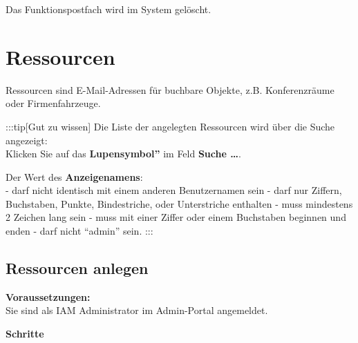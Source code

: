 \documentclass[
  letterpaper,
  DIV=11,
  numbers=noendperiod]{scrreprt}
\begin{document}
Das Funktionspostfach wird im System gelöscht.

\section{Ressourcen}\label{ressourcen}

Ressourcen sind E-Mail-Adressen für buchbare Objekte, z.B.
Konferenzräume oder Firmenfahrzeuge.

:::tip{[}Gut zu wissen{]} Die Liste der angelegten Ressourcen wird über
die Suche angezeigt:\\
Klicken Sie auf das \textbf{Lupensymbol''} im Feld \textbf{Suche
\ldots{}}.

Der Wert des \textbf{Anzeigenamens}:\\
- darf nicht identisch mit einem anderen Benutzernamen sein - darf nur
Ziffern, Buchstaben, Punkte, Bindestriche, oder Unterstriche enthalten -
muss mindestens 2 Zeichen lang sein - muss mit einer Ziffer oder einem
Buchstaben beginnen und enden - darf nicht ``admin'' sein. :::

\subsection{Ressourcen anlegen}\label{ressourcen-anlegen}

\textbf{Voraussetzungen:}\\
Sie sind als IAM Administrator im Admin-Portal angemeldet.

\textbf{Schritte}
\end{document}
